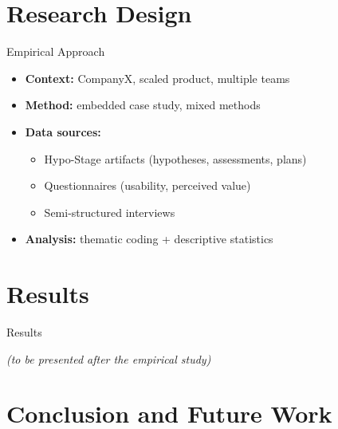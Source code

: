 \documentclass[
  xcolor={hyperref,svgnames,x11names,table},
  hyperref={pdfencoding=unicode,plainpages=false,pdfpagelabels=true,breaklinks=true},
  brazilian,english,12pt,aspectratio=149,
]{beamer}
\begin{document}
\section{Research Design}

\begin{frame}{Empirical Approach}
  \begin{itemize}
    \item \textbf{Context:} CompanyX, scaled product, multiple teams
    \item \textbf{Method:} embedded case study, mixed methods
    \item \textbf{Data sources:}
    \begin{itemize}
      \item Hypo-Stage artifacts (hypotheses, assessments, plans)
      \item Questionnaires (usability, perceived value)
      \item Semi-structured interviews
    \end{itemize}
    \item \textbf{Analysis:} thematic coding + descriptive statistics
  \end{itemize}

\end{frame}


\section{Results}

\begin{frame}{Results}
  \begin{center}
    \textit{(to be presented after the empirical study)}
  \end{center}
\end{frame}


\section{Conclusion and Future Work}
\end{document}

